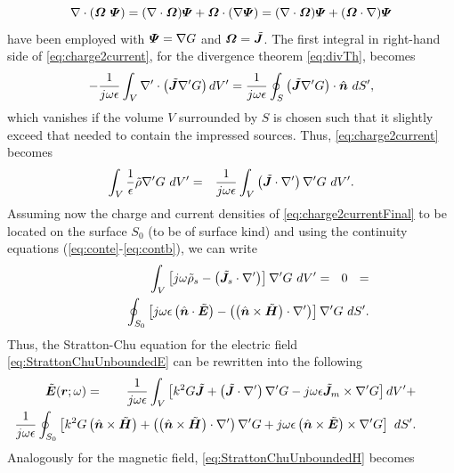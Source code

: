\begin{equation}
\nabla \cdot (\mbfit{\Omega} \ \mbfit{\Psi}) = (\nabla \cdot \mbfit{\Omega}) \mbfit{\Psi} + \mbfit{\Omega} \cdot (\nabla \mbfit{\Psi}) =  (\nabla \cdot \mbfit{\Omega}) \mbfit{\Psi} + (\mbfit{\Omega} \cdot \nabla) \mbfit{\Psi}
\end{equation} have been employed with $\mbfit{\Psi} = \nabla G$ and $\mbfit{\Omega} = \tilde{\mbfit{J}}$. The first integral in right-hand side of \eqref{eq:charge2current}, for the divergence theorem \eqref{eq:divTh}, becomes
\begin{equation}
- \frac{1}{j \omega \epsilon} \int_V {\nabla}{'} \cdot \left ( \tilde{\mbfit{J}} {\nabla}{'} G  \right ) dV' = \frac{1}{j \omega \epsilon} \oint_S  \left ( \tilde{\mbfit{J}} {\nabla}{'} G  \right ) \cdot \hat{\mbfit{n}} \ dS',
\end{equation} which vanishes if the volume $V$ surrounded by $S$ is chosen such that it slightly exceed that needed to contain the impressed sources. Thus, \eqref{eq:charge2current} becomes
\begin{eqnarray}
\int_V \frac{1}{\epsilon} \tilde{\rho} {\nabla}{'} G \ dV' &= & \frac{1}{j \omega \epsilon} \int_V \left ( \tilde{\mbfit{J}} \cdot {\nabla}{'} \right ) {\nabla}{'} G \ dV'. \label{eq:charge2currentFinal}
\end{eqnarray} Assuming now the charge and current densities of \eqref{eq:charge2currentFinal} to be located on the surface $S_0$ (to be of surface kind) and using the continuity equations (\ref{eq:conte}-\ref{eq:contb}), we can write
\begin{eqnarray}
& &\int_V \left [ j \omega \tilde{\rho}_s - \left ( \tilde{\mbfit{J}}_s \cdot {\nabla}' \right ) \right ]  {\nabla}' G \ dV' = \ \ 0 \ \ =  \nonumber \\
& & \hspace{0.5cm} \ \oint_{S_0} \left [ j \omega \epsilon \left ( \hat{\mbfit{n}} \cdot \tilde{\mbfit{E}} \right )  - \left ( \left ( \hat{\mbfit{n}} \times \tilde{\mbfit{H}} \right ) \cdot {\nabla}' \right ) \right ] {\nabla}' G \ dS'\label{eq:charge2currentSubstitutions}.
\end{eqnarray} Thus, the Stratton-Chu equation for the electric field \eqref{eq:StrattonChuUnboundedE} can be rewritten into the following  \cite{OrfanidisEWA}
\begin{eqnarray}
\label{eq:KottlerE}
\tilde{\mbfit{E}}(\mbfit{r}; \omega) &= & \frac{1}{j \omega \epsilon} \int_V \left [ k^2 G \tilde{\mbfit{J}} + \left ( \tilde{\mbfit{J}} \cdot {\nabla}' \right )  {\nabla}' G - j \omega \epsilon \tilde{\mbfit{J}}_m  \times {\nabla}' G \right ] dV' + \nonumber \\
& & \hspace{-2.75cm} \frac{1}{j \omega \epsilon} \oint_{S_0} \left [  k^2 G \left ( \hat{\mbfit{n}} \times \tilde{\mbfit{H}} \right ) +  \left ( \left ( \hat{\mbfit{n}} \times \tilde{\mbfit{H}} \right ) \cdot {\nabla}' \right ) {\nabla}'  G  + j \omega \epsilon \left ( \hat{\mbfit{n}} \times \tilde{\mbfit{E}} \right ) \times {\nabla}' G \right ] \ dS'.
\end{eqnarray} Analogously for the magnetic field, \eqref{eq:StrattonChuUnboundedH} becomes
